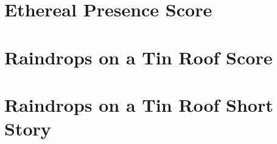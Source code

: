 

\chapter{Ethereal Presence Score}



\chapter{Raindrops on a Tin Roof Score}

 

\chapter{Raindrops on a Tin Roof Short Story}








\backmatter


